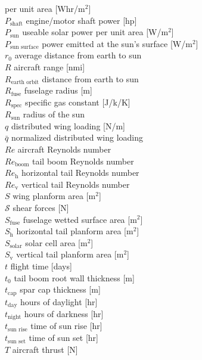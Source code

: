 \documentclass[]{aiaa-tc}%
\begin{document}
\begin{multicols}{2}
\begin{tabbing}
\>per unit area [Whr/m$^2$] \\
$P_{\text{shaft}}$ \> engine/motor shaft power [hp] \\
$P_{\text{sun}}$ \> useable solar power per unit area [W/m$^2$] \\
$P_{\text{sun surface}}$ \> power emitted at the sun's surface [W/m$^2$] \\
$r_0$ \> average distance from earth to sun \\
$R$ \> aircraft range [nmi] \\
$R_{\text{earth orbit}}$ \> distance from earth to sun \\
$R_{\text{fuse}}$ \> fuselage radius [m] \\
$R_{\text{spec}}$ \> specific gas constant [J/k/K] \\
$R_{\text{sun}}$ \> radius of the sun \\
$q$ \> distributed wing loading [N/m] \\
$\bar{q}$ \> normalized distributed wing loading \\
$Re$ \> aircraft Reynolds number \\
$Re_{\text{boom}}$ \> tail boom Reynolds number \\
$Re_{\text{h}}$ \> horizontal tail Reynolds number \\
$Re_{\text{v}}$ \> vertical tail Reynolds number \\
$S$ \> wing planform area [m$^2$]\\
$\mathcal{S}$ \> shear forces [N] \\
$S_{\text{fuse}}$ \> fuselage wetted surface area [m$^2$]\\
$S_{\text{h}}$ \> horizontal tail planform area [m$^2$]\\
$S_{\text{solar}}$ \> solar cell area [m$^2$]\\
$S_{\text{v}}$ \> vertical tail planform area [m$^2$]\\
$t$ \> flight time [days] \\
$t_0$ \> tail boom root wall thickness [m] \\
$t_{\text{cap}}$ \> spar cap thickness [m] \\
$t_{\text{day}}$ \> hours of daylight [hr] \\
$t_{\text{night}}$ \> hours of darkness [hr] \\
$t_{\text{sun rise}}$ \> time of sun rise [hr] \\
$t_{\text{sun set}}$ \> time of sun set [hr] \\
$T$ \> aircraft thrust [N] \\

\end{tabbing}
\end{multicols}
\end{document}
